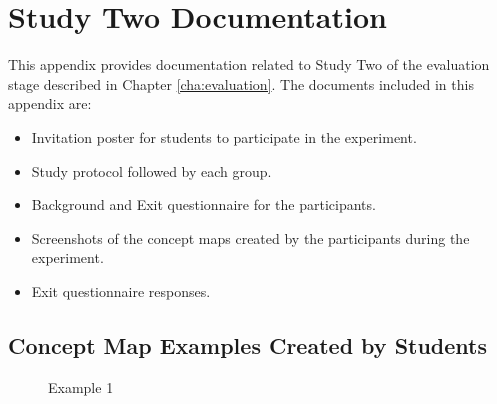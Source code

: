 \chapter{Study Two Documentation \label{cha:app6}}

This appendix provides documentation related to Study Two of the evaluation
stage described in Chapter \ref{cha:evaluation}. The documents included in this
appendix are:

\begin{itemize}
  \item Invitation poster for students to participate in the experiment.
  \item Study protocol followed by each group.
  \item Background and Exit questionnaire for the participants.
  \item Screenshots of the concept maps created by the participants during the
  experiment.
  \item Exit questionnaire responses.
\end{itemize}





 



\section{Concept Map Examples Created by Students}
\label{sec:examples1}

\begin{figure}[!htb]
\centering
\setlength\fboxsep{0pt}
\setlength\fboxrule{0.5pt}
\caption{Example 1}
\end{figure}

